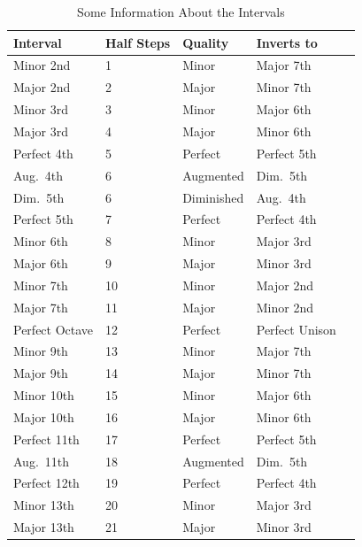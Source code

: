 \vspace{\parskip}
\begin{table}[h]
\centering
\begin{tabularx}{\textwidth}{X X X X X}
\toprule
\textbf{Interval}  & \textbf{Half Steps} & \textbf{Quality} & \textbf{Inverts to} \\
\midrule
Minor 2nd           & 1  & Minor      & Major 7th      \\
Major 2nd           & 2  & Major      & Minor 7th      \\
Minor 3rd           & 3  & Minor      & Major 6th      \\
Major 3rd           & 4  & Major      & Minor 6th      \\
Perfect 4th         & 5  & Perfect    & Perfect 5th    \\
Aug.\ 4th           & 6  & Augmented  & Dim.\ 5th      \\
Dim.\ 5th           & 6  & Diminished & Aug.\ 4th      \\
Perfect 5th         & 7  & Perfect    & Perfect 4th    \\
Minor 6th           & 8  & Minor      & Major 3rd      \\
Major 6th           & 9  & Major      & Minor 3rd      \\
Minor 7th           & 10 & Minor      & Major 2nd      \\
Major 7th           & 11 & Major      & Minor 2nd      \\
Perfect Octave      & 12 & Perfect    & Perfect Unison \\
Minor 9th           & 13 & Minor      & Major 7th      \\
Major 9th           & 14 & Major      & Minor 7th      \\
Minor 10th          & 15 & Minor      & Major 6th      \\
Major 10th          & 16 & Major      & Minor 6th      \\
Perfect 11th        & 17 & Perfect    & Perfect 5th    \\
Aug.\ 11th          & 18 & Augmented  & Dim.\ 5th      \\
Perfect 12th        & 19 & Perfect    & Perfect 4th    \\
Minor 13th          & 20 & Minor      & Major 3rd      \\
Major 13th          & 21 & Major      & Minor 3rd      \\
\bottomrule
\end{tabularx}
\caption{Some Information About the Intervals}
\end{table}
\vspace{\parskip}

